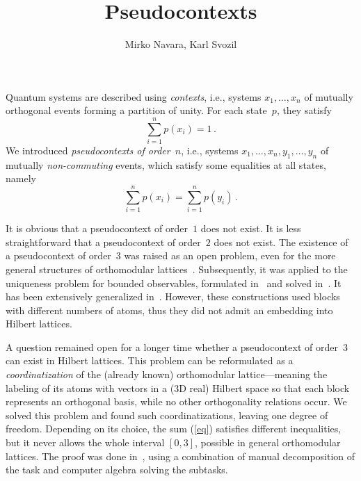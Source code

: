 \documentclass[10pt,a4paper]{amsart}
\title{Pseudocontexts}
\author{Mirko Navara, Karl Svozil}
\date{}                                           %
\begin{document}
\maketitle
\thispagestyle{empty}
\pagestyle{empty}

Quantum systems are described using \emph{contexts}, i.e., systems $x_1,\ldots,x_n$ of mutually orthogonal events forming a partition of unity.
For each state~$p$, they satisfy
$$\sum_{i=1}^n p(x_i)=1\,.$$
We introduced  \emph{pseudocontexts of order~$n$}, i.e., systems $x_1,\ldots,x_n, y_1,\ldots,y_n$ of mutually \emph{non-commuting} events, which satisfy some equalities at all states, namely
\begin{equation}
\sum_{i=1}^n p(x_i)=\sum_{i=1}^n p(y_i)\,.
\label{eq}
\end{equation}

It is obvious that a pseudocontext of order~$1$ does not exist.
It is less straightforward that  a pseudocontext of order~$2$ does not exist.
The existence of a pseudocontext of order~$3$ was raised as an open problem,
even for the more general structures of orthomodular lattices~\cite{Rog:correspondentce}.
Subsequently, it was applied to the uniqueness problem for bounded observables, formulated in~\cite{Gudder:Uniq} and solved in~\cite{N:Uniqueness}.
It has been extensively generalized in~\cite{MayetNR}.
However, these constructions used blocks with different numbers of atoms, thus they did not admit an embedding into Hilbert lattices.

A question remained open for a longer time whether a pseudocontext of order~$3$
can exist in Hilbert lattices. This problem can be reformulated as a \emph{coordinatization} of the (already known) orthomodular
lattice---meaning the labeling of its atoms with vectors in a (3D real) Hilbert space so that each block represents an orthogonal basis,
while no other orthogonality relations occur. We solved this problem and found such coordinatizations, leaving one degree of freedom.
Depending on its choice, the sum (\ref{eq}) satisfies different inequalities, but it never allows the whole interval $[0,3]$,
possible in general orthomodular lattices.
The proof was done in~\cite{NSvozil:pseudocontext}, using a combination of manual decomposition of the task and computer algebra solving the subtasks.


\end{document}
